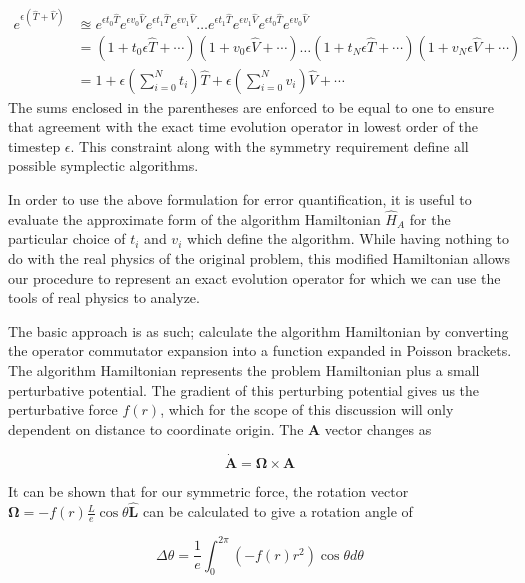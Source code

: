 \documentclass[8pt,a4paper]{article}
\begin{document}
	\begin{align}
		e^{\epsilon(\hat{T} + \hat{V})} &\approxeq e^{\epsilon t_0\hat{T}} e^{\epsilon v_0\hat{V}}
		e^{\epsilon t_1\hat{T}} e^{\epsilon v_1\hat{V}} \ldots
		e^{\epsilon t_1\hat{T}} e^{\epsilon v_1\hat{V}}
		e^{\epsilon t_0\hat{T}} e^{\epsilon v_0\hat{V}} \\
		&=
		(1+t_0\epsilon \hat{T} + \cdots)
		(1+v_0\epsilon \hat{V} + \cdots) \ldots
		(1+t_N\epsilon \hat{T} + \cdots)
		(1+v_N\epsilon \hat{V} + \cdots)  \\
		&=
		1 + \epsilon\left(\sum_{i=0}^{N} t_i\right)\hat{T} + \epsilon\left(\sum_{i=0}^{N} v_i\right)\hat{V} + \cdots
	\end{align}
	The sums enclosed in the parentheses are enforced to be equal to one to ensure that agreement with the exact time evolution operator in lowest order of the timestep $\epsilon$. This constraint along with the symmetry requirement define all possible symplectic algorithms.
	
	In order to use the above formulation for error quantification, it is useful to evaluate the approximate form of the algorithm Hamiltonian $\hat{H}_A$ for the particular choice of $t_i$ and $v_i$ which define the algorithm. While having nothing to do with the real physics of the original problem, this modified Hamiltonian allows our procedure to represent an exact evolution operator for which we can use the tools of real physics to analyze.
	
	The basic approach is as such; calculate the algorithm Hamiltonian by converting the operator commutator expansion into a function expanded in Poisson brackets. The algorithm Hamiltonian represents the problem Hamiltonian plus a small perturbative potential. The gradient of this perturbing potential gives us the perturbative force $f(r)$, which for the scope of this discussion will only dependent on distance to coordinate origin. The $\mathbf{A}$ vector changes as
	
	\begin{equation}
		\mathbf{\dot{A}} = \mathbf{\Omega} \times \mathbf{A}
	\end{equation}
	
	It can be shown that for our symmetric force, the rotation vector $\mathbf{\Omega} = -f(r)\frac{L}{e}\cos \theta \mathbf{\hat{L}}$ can be calculated to give a rotation angle of
	
	\begin{equation}
		\Delta \theta = \frac{1}{e}\int_{0}^{2\pi}(-f(r)r^2)\cos\theta d\theta
	\end{equation}
	
\end{document}
